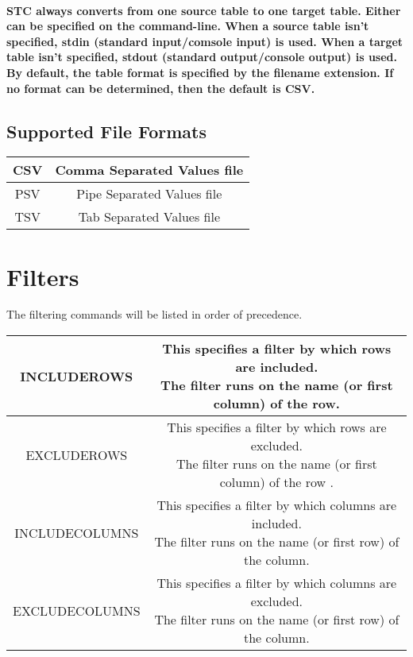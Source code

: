 \documentclass[11pt]{article}
\begin{document}
\paragraph{STC always converts from one source table to one target table.  Either can be specified on the command-line.  When a source table isn’t specified, stdin (standard input/comsole input) is used.  When a target table isn’t specified, stdout (standard output/console output) is used.  By default, the table format is specified by the filename extension.  If no format can be determined, then the default is CSV.}

\subsection{Supported File Formats}
\begin{center}
\begin{tabular}{ | c | c | }
\hline
CSV & Comma Separated Values file \\
\hline
PSV & Pipe Separated Values file \\
\hline
TSV & Tab Separated Values file \\
\hline
\end{tabular}
\end{center}

\section{Filters}
The filtering commands will be listed in order of precedence.
\\
\begin{center}
\begin{tabular}{ | c | c | }
\hline
INCLUDEROWS & \makecell{ This specifies a filter by which rows are included. \\ The filter runs on the name (or first column) of the row. } \\
\hline
EXCLUDEROWS & \makecell{ This specifies a filter by which rows are excluded. \\ The filter runs on the name (or first column) of the row .} \\
\hline
INCLUDECOLUMNS & \makecell{ This specifies a filter by which columns are included. \\ The filter runs on the name (or first row) of the column. } \\
\hline
EXCLUDECOLUMNS & \makecell{ This specifies a filter by which columns are excluded. \\ The filter runs on the name (or first row) of the column. } \\
\hline
\end{tabular}
\end{center}
\end{document}
